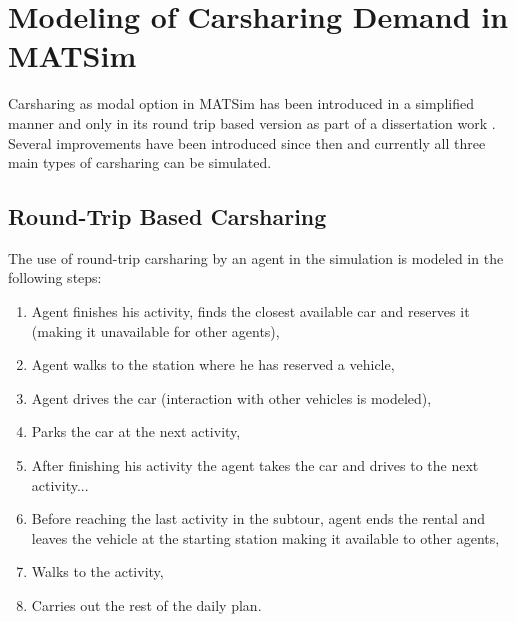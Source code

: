 \section{Modeling of Carsharing Demand in MATSim}
Carsharing as modal option in MATSim has been introduced in a simplified manner and only in its round trip based version as part of a dissertation work \citep[][]{Ciari_PhDThesis_2012}. Several improvements have been introduced since then and currently all three main types of carsharing can be simulated.

\subsection{Round-Trip Based Carsharing}
The use of round-trip carsharing by an agent in the simulation is modeled in the following steps: 
\begin{enumerate}
	\item Agent finishes his activity, finds the closest available car and reserves it (making it unavailable for other agents),
	\item Agent walks to the station where he has reserved a vehicle,
	\item Agent drives the car (interaction with other vehicles is modeled),
	\item Parks the car at the next activity,
	\item After finishing his activity the agent takes the car and drives to the next activity...
	\item Before reaching the last activity in the subtour, agent ends the rental and leaves the vehicle at the starting station making it available to other agents,
	\item Walks to the activity,
	\item Carries out the rest of the daily plan.
\end{enumerate}

